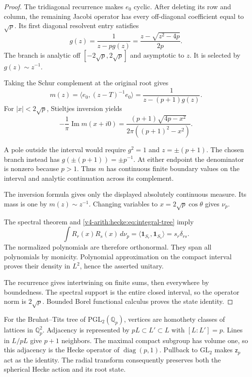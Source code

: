 \begin{proof}
The tridiagonal recurrence makes $e_0$ cyclic.
After deleting its row and column, the remaining Jacobi operator
has every off-diagonal coefficient equal to $\sqrt p$.
Its first diagonal resolvent entry satisfies
\[
 g(z)=\frac1{z-pg(z)}
 =\frac{z-\sqrt{z^2-4p}}{2p}.
\]
The branch is analytic off $[-2\sqrt p,2\sqrt p]$ and asymptotic to $z$.
It is selected by $g(z)\sim z^{-1}$.

Taking the Schur complement at the original root gives
\[
 m(z)=\langle e_0,(z-T)^{-1}e_0\rangle
 =\frac1{z-(p+1)g(z)}.
\]
For $|x|<2\sqrt p$, Stieltjes inversion yields
\[
 -\frac1\pi\operatorname{Im}m(x+i0)
 =\frac{(p+1)\sqrt{4p-x^2}}{2\pi((p+1)^2-x^2)}.
\]

A pole outside the interval would require $g^2=1$ and $z=\pm(p+1)$.
The chosen branch instead has $g(\pm(p+1))=\pm p^{-1}$.
At either endpoint the denominator is nonzero because $p>1$.
Thus $m$ has continuous finite boundary values on the interval
and analytic continuation across its complement.

The inversion formula gives only the displayed absolutely continuous measure.
Its mass is one by $m(z)\sim z^{-1}$.
Changing variables to $x=2\sqrt p\cos\theta$ gives $\nu_p$.

The spectral theorem and \eqref{v4-arith:hecke:eq:integral-tree} imply
\[
 \int R_r(x)R_s(x)\,d\nu_p
 =\langle\mathbf1_{S_r},\mathbf1_{S_s}\rangle=s_r\delta_{rs}.
\]
The normalized polynomials are therefore orthonormal.
They span all polynomials by monicity.
Polynomial approximation on the compact interval proves their
density in $L^2$, hence the asserted unitary.

The recurrence gives intertwining on finite sums, then everywhere
by boundedness. The spectral support is the entire closed interval,
so the operator norm is $2\sqrt p$.
Bounded Borel functional calculus proves the state identity.
\end{proof}

For the Bruhat--Tits tree of $\mathrm{PGL}_2(\mathbb Q_p)$,
vertices are homothety classes of lattices in $\mathbb Q_p^2$.
Adjacency is represented by
$pL\subset L'\subset L$ with $[L:L']=p$.
Lines in $L/pL$ give $p+1$ neighbors.
The maximal compact subgroup has volume one, so this adjacency
is the Hecke operator of $\operatorname{diag}(p,1)$.
Pullback to $\mathrm{GL}_2$ makes $\mathsf z_p$ act as the identity.
The radial transform consequently preserves both the spherical
Hecke action and its root state.

